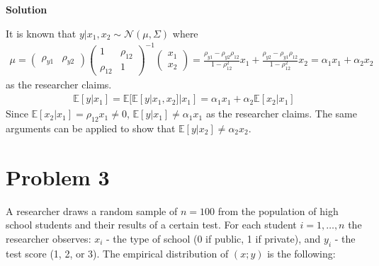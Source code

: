 \documentclass[a4paper]{article}
\newcommand{\norma}{\mathscr{N}}
\newcommand{\expect}{\mathbb{E}}
\begin{document}
	
	
	\textbf{Solution}
	
	
	It is known that $y|x_1,x_2 \sim \norma(\mu, \Sigma)$ where
	\begin{align*}
	\mu = \begin{pmatrix}
	\rho_{y1} & \rho_{y2}
	\end{pmatrix} \begin{pmatrix}
	1 & \rho_{12}\\
	\rho_{12} & 1
	\end{pmatrix}^{-1} \begin{pmatrix}
	x_1\\
	x_2
	\end{pmatrix} = \frac{\rho_{y1} - \rho_{y2}\rho_{12}}{1 - \rho_{12}^2}x_1 + \frac{\rho_{y2} - \rho_{y1}\rho_{12}}{1 - \rho_{12}^2}x_2 = \alpha_1 x_1 + \alpha_2 x_2
	\end{align*}
	as the researcher claims.  
	\begin{align*}
	\expect[y|x_1] = \expect[\expect[y|x_1, x_2]|x_1] = \alpha_1 x_1 + \alpha_2\expect[x_2|x_1]
	\end{align*}
	Since $\expect[x_2|x_1] = \rho_{12}x_1 \neq 0$,  $\expect[y|x_1] \neq \alpha_1x_1$ as the researcher claims. The same arguments can be applied to show that $\expect[y|x_2] \neq \alpha_2 x_2$.
	
	
	\section*{Problem 3}
	A researcher draws a random sample of $n = 100$ from the population of high school students
	and their results of a certain test. For each student $i = 1, \dots, n$ the researcher observes: $x_i$ - 
	the type of school (0 if public, 1 if private), and $y_i$ - the test score (1, 2, or 3). The empirical
	distribution of $(x; y)$ is the following:
	
\end{document}
